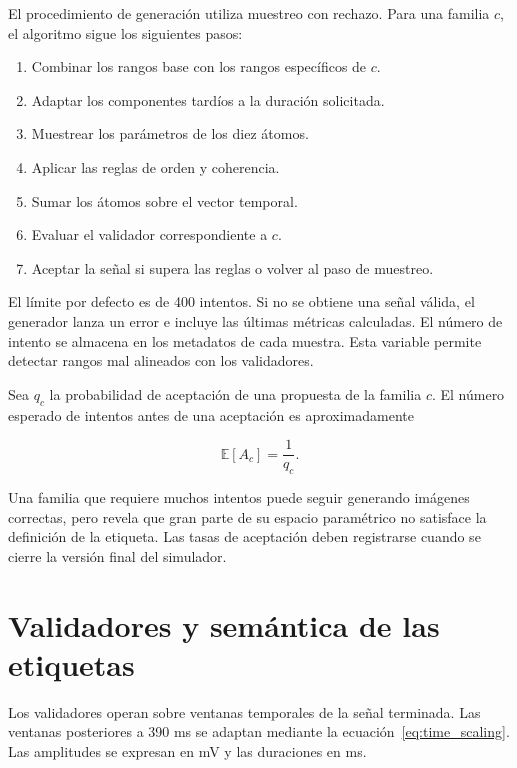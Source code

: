 El procedimiento de generación utiliza muestreo con rechazo. Para una familia \(c\), el algoritmo sigue los siguientes pasos:

\begin{enumerate}
\item Combinar los rangos base con los rangos específicos de \(c\).
\item Adaptar los componentes tardíos a la duración solicitada.
\item Muestrear los parámetros de los diez átomos.
\item Aplicar las reglas de orden y coherencia.
\item Sumar los átomos sobre el vector temporal.
\item Evaluar el validador correspondiente a \(c\).
\item Aceptar la señal si supera las reglas o volver al paso de muestreo.
\end{enumerate}

El límite por defecto es de 400 intentos. Si no se obtiene una señal válida, el generador lanza un error e incluye las últimas métricas calculadas. El número de intento se almacena en los metadatos de cada muestra. Esta variable permite detectar rangos mal alineados con los validadores.

Sea \(q_c\) la probabilidad de aceptación de una propuesta de la familia \(c\). El número esperado de intentos antes de una aceptación es aproximadamente

\begin{equation}
\mathbb{E}[A_c] =
\frac{1}{q_c}.
\end{equation}

Una familia que requiere muchos intentos puede seguir generando imágenes correctas, pero revela que gran parte de su espacio paramétrico no satisface la definición de la etiqueta. Las tasas de aceptación deben registrarse cuando se cierre la versión final del simulador.

\section{Validadores y semántica de las etiquetas}

Los validadores operan sobre ventanas temporales de la señal terminada. Las ventanas posteriores a 390 ms se adaptan mediante la ecuación~\ref{eq:time_scaling}. Las amplitudes se expresan en mV y las duraciones en ms.


